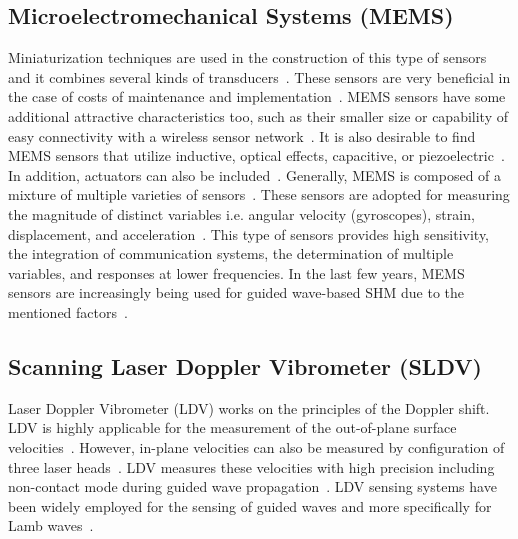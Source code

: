 \documentclass[b5paper, 11pt, titlepage]{book}
\begin{document}
\subsection{Microelectromechanical Systems (MEMS)}
Miniaturization techniques are used in the construction of this type of sensors and it combines several kinds of transducers~\cite{Zhen2017}. These sensors are very beneficial in the case of costs of maintenance and implementation~\cite{cochran2012comparison}. MEMS sensors have some additional attractive characteristics too, such as their smaller size or capability of easy connectivity with a wireless sensor network~\cite{TibaduizaBurgos2020}. It is also desirable to find MEMS sensors that utilize inductive, optical effects, capacitive, or piezoelectric~\cite{chang2013structural, Saboonchi2016}. In addition, actuators can also be included~\cite{Dixit2018}. Generally, MEMS is composed of a mixture of multiple varieties of sensors~\cite{debeda2014study}. These sensors are adopted for measuring the magnitude of distinct variables i.e. angular velocity (gyroscopes), strain, displacement, and acceleration~\cite{Farrar2012, TibaduizaBurgos2020}. This type of sensors provides high sensitivity, the integration of communication systems, the determination of multiple variables, and responses at lower frequencies. In the last few years, MEMS sensors are increasingly being used for guided wave-based SHM due to the mentioned factors~\cite{kim2002wireless, varadan2003nanotechnology, guldiken2011structural}.

\subsection{Scanning Laser Doppler Vibrometer (SLDV)}
Laser Doppler Vibrometer (LDV) works on the principles of the Doppler shift. LDV is highly applicable for the measurement of the out-of-plane surface velocities~\cite{Mitra2016}. However, in-plane velocities can also be measured by configuration of three laser heads~\cite{Staszewski2007}.  LDV measures these velocities with high precision including non-contact mode during guided wave propagation~\cite{Mitra2016}. LDV sensing systems have been widely employed for the sensing of guided waves and more specifically for Lamb waves~\cite{Mitra2016}. 
\end{document}
